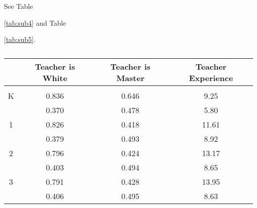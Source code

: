 \documentclass{article}
\begin{document}
{{{See Table {\ref{tab:sub4} and Table {\ref{tab:sub5}.

\begin{table}[htbp]
  \centering
  \caption{}
  \label{tab:sub4}
    \begin{tabular}{rccc}
    \toprule
          & Teacher is White & Teacher is Master & Teacher Experience \\
    \midrule
          &       &       &  \\
    \multicolumn{1}{c}{K} & 0.836  & 0.646  & 9.25  \\
          & 0.370  & 0.478  & 5.80  \\
    \multicolumn{1}{c}{1} & 0.826  & 0.418  & 11.61  \\
          & 0.379  & 0.493  & 8.92  \\
    \multicolumn{1}{c}{2} & 0.796  & 0.424  & 13.17  \\
          & 0.403  & 0.494  & 8.65  \\
    \multicolumn{1}{c}{3} & 0.791  & 0.428  & 13.95  \\
          & 0.406  & 0.495  & 8.63  \\
    \bottomrule
    \bottomrule
    \end{tabular}%
  \label{tab:addlabel}%
\end{table}%


}}}}}
\end{document}
